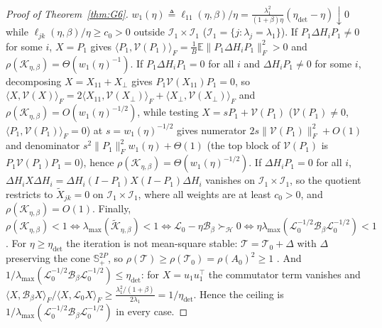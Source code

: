 \documentclass[11pt]{article}
\theoremstyle{remark}
\newcommand{\E}{\mathbb{E}}
\begin{document}
\begin{proof}[Proof of Theorem~\ref{thm:G6}]
$w_1(\eta)\triangleq\ell_{11}(\eta,\beta)/\eta=\frac{\lambda_1^2}{(1+\beta)\eta}(\eta_{\mathrm{det}}-\eta)\downarrow0$ while $\ell_{jk}(\eta,\beta)/\eta\ge c_0>0$ outside $\mathcal I_1\times\mathcal I_1$ ($\mathcal I_1=\{j:\lambda_j=\lambda_1\}$). If $P_1\Delta H_iP_1\ne0$ for some $i$, $X=P_1$ gives $\langle P_1,\mathcal V(P_1)\rangle_F=\frac1B\E\|P_1\Delta H_iP_1\|_F^2>0$ and $\rho(\mathcal K_{\eta,\beta})=\Theta(w_1(\eta)^{-1})$. If $P_1\Delta H_iP_1=0$ for all $i$ and $\Delta H_iP_1\ne0$ for some $i$, decomposing $X=X_{11}+X_\perp$ gives $P_1\mathcal V(X_{11})P_1=0$, so $\langle X,\mathcal V(X)\rangle_F=2\langle X_{11},\mathcal V(X_\perp)\rangle_F+\langle X_\perp,\mathcal V(X_\perp)\rangle_F$ and $\rho(\mathcal K_{\eta,\beta})=O(w_1(\eta)^{-1/2})$, while testing $X=sP_1+\mathcal V(P_1)$ ($\mathcal V(P_1)\ne0$, $\langle P_1,\mathcal V(P_1)\rangle_F=0$) at $s=w_1(\eta)^{-1/2}$ gives numerator $2s\|\mathcal V(P_1)\|_F^2+O(1)$ and denominator $s^2\|P_1\|_F^2w_1(\eta)+\Theta(1)$ (the top block of $\mathcal V(P_1)$ is $P_1\mathcal V(P_1)P_1=0$), hence $\rho(\mathcal K_{\eta,\beta})=\Theta(w_1(\eta)^{-1/2})$. If $\Delta H_iP_1=0$ for all $i$, $\Delta H_iX\Delta H_i=\Delta H_i(I-P_1)X(I-P_1)\Delta H_i$ vanishes on $\mathcal I_1\times\mathcal I_1$, so the quotient restricts to $\widetilde X_{jk}=0$ on $\mathcal I_1\times\mathcal I_1$, where all weights are at least $c_0>0$, and $\rho(\mathcal K_{\eta,\beta})=O(1)$. Finally, $\rho(\mathcal K_{\eta,\beta})<1\iff\lambda_{\max}(\widetilde{\mathcal K}_{\eta,\beta})<1\iff\mathcal L_0-\eta\mathcal B_\beta\succ_{\mathcal H}0\iff\eta\lambda_{\max}(\mathcal L_0^{-1/2}\mathcal B_\beta\mathcal L_0^{-1/2})<1$. For $\eta\ge\eta_{\mathrm{det}}$ the iteration is not mean-square stable: $\mathcal T=\mathcal T_0+\Delta$ with $\Delta$ preserving the cone $\mathbb S_+^{2P}$, so $\rho(\mathcal T)\ge\rho(\mathcal T_0)=\rho(A_0)^2\ge1$ \citep[Ch.~1]{berman1994}. And $1/\lambda_{\max}(\mathcal L_0^{-1/2}\mathcal B_\beta\mathcal L_0^{-1/2})\le\eta_{\mathrm{det}}$: for $X=u_1u_1^\top$ the commutator term vanishes and $\langle X,\mathcal B_\beta X\rangle_F/\langle X,\mathcal L_0X\rangle_F\ge\frac{\lambda_1^2/(1+\beta)}{2\lambda_1}=1/\eta_{\mathrm{det}}$. Hence the ceiling is $1/\lambda_{\max}(\mathcal L_0^{-1/2}\mathcal B_\beta\mathcal L_0^{-1/2})$ in every case.
\end{proof}
\end{document}
